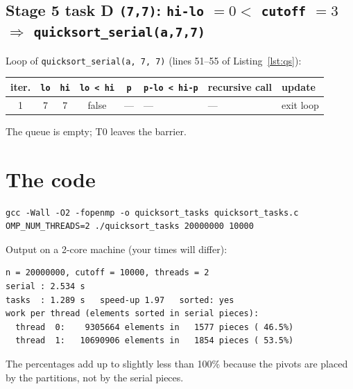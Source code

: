 \documentclass[11pt,a4paper]{article}
\let\origtexttt\texttt
\renewcommand{\texttt}[1]{\textcolor{black!60}{\origtexttt{#1}}}
\newcommand{\arr}[1]{%
  \foreach \v/\c [count=\k from 0] in {#1} {
    \node[\c] at (0.85*\k,0) {\v};
    \node[font=\tiny, text=gray] at (0.85*\k,0.6) {\k};
  }}
\begin{document}
\subsection*{Stage 5 \quad task D \texttt{(7,7)}: \texttt{hi-lo} $= 0 <$ \texttt{cutoff} $= 3$ $\Rightarrow$ \texttt{quicksort\_serial(a,7,7)}}
\noindent Loop of \texttt{quicksort\_serial(a, 7, 7)} (lines 51--55 of Listing~\ref{lst:qs}):
\begin{center}
\small
\begin{tabular}{@{}ccccclll@{}}
\toprule
iter. & \texttt{lo} & \texttt{hi} & \texttt{lo < hi} & \texttt{p} & \texttt{p-lo < hi-p} & recursive call & update \\ \midrule
1 & 7 & 7 & false & --- & --- & --- & exit loop \\
\bottomrule
\end{tabular}
\end{center}
The queue is empty; T0 leaves the barrier.
\begin{center}
\end{center}

\section{The code}\label{sec:code}


\begin{lstlisting}[style=sh]
gcc -Wall -O2 -fopenmp -o quicksort_tasks quicksort_tasks.c
OMP_NUM_THREADS=2 ./quicksort_tasks 20000000 10000
\end{lstlisting}
Output on a 2-core machine (your times will differ):
\begin{lstlisting}[style=sh]
n = 20000000, cutoff = 10000, threads = 2
serial : 2.534 s
tasks  : 1.289 s   speed-up 1.97   sorted: yes
work per thread (elements sorted in serial pieces):
  thread  0:    9305664 elements in   1577 pieces ( 46.5%)
  thread  1:   10690906 elements in   1854 pieces ( 53.5%)
\end{lstlisting}
The percentages add up to slightly less than 100\% because the pivots are placed by the
partitions, not by the serial pieces.
\end{document}
